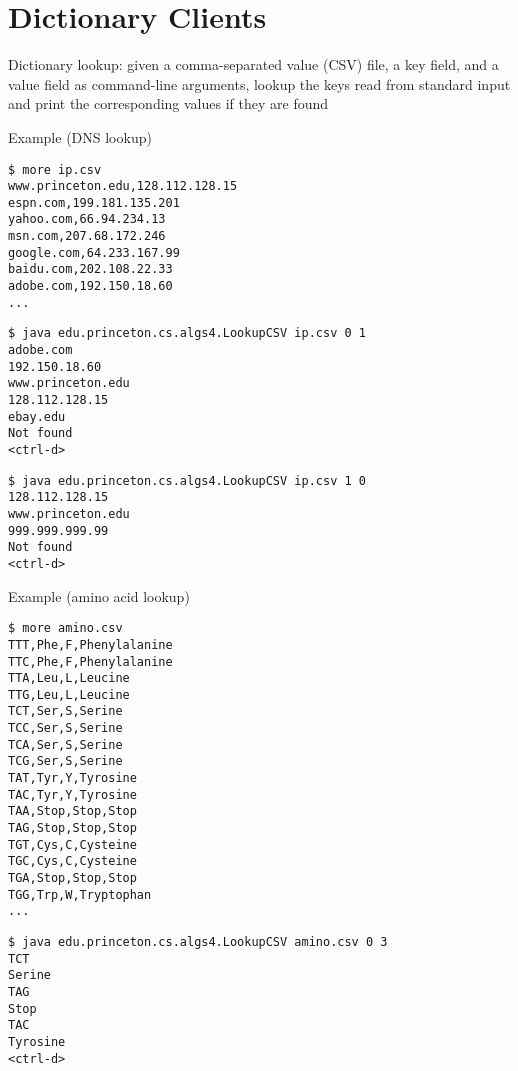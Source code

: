 \documentclass[8pt,a4paper,compress]{beamer}
\begin{document}
\section{Dictionary Clients}
\begin{frame}[fragile]
\pause

Dictionary lookup: given a comma-separated value (CSV) file, a key field, and a value field as command-line arguments, lookup the keys read from standard input and print the corresponding values if they are found

\pause
\bigskip

Example (DNS lookup)
\begin{lstlisting}[language={}]
$ more ip.csv
www.princeton.edu,128.112.128.15
espn.com,199.181.135.201
yahoo.com,66.94.234.13
msn.com,207.68.172.246
google.com,64.233.167.99
baidu.com,202.108.22.33
adobe.com,192.150.18.60
...
\end{lstlisting}
\begin{lstlisting}[language={}]
$ java edu.princeton.cs.algs4.LookupCSV ip.csv 0 1
adobe.com
192.150.18.60
www.princeton.edu
128.112.128.15
ebay.edu
Not found 
<ctrl-d>
\end{lstlisting}
\begin{lstlisting}[language={}]
$ java edu.princeton.cs.algs4.LookupCSV ip.csv 1 0
128.112.128.15
www.princeton.edu
999.999.999.99
Not found
<ctrl-d>
\end{lstlisting}
\end{frame}

\begin{frame}[fragile]
\pause

Example (amino acid lookup)
\begin{lstlisting}[language={}]
$ more amino.csv
TTT,Phe,F,Phenylalanine
TTC,Phe,F,Phenylalanine
TTA,Leu,L,Leucine
TTG,Leu,L,Leucine
TCT,Ser,S,Serine
TCC,Ser,S,Serine
TCA,Ser,S,Serine
TCG,Ser,S,Serine
TAT,Tyr,Y,Tyrosine
TAC,Tyr,Y,Tyrosine
TAA,Stop,Stop,Stop
TAG,Stop,Stop,Stop
TGT,Cys,C,Cysteine
TGC,Cys,C,Cysteine
TGA,Stop,Stop,Stop
TGG,Trp,W,Tryptophan
...
\end{lstlisting}

\begin{lstlisting}[language={}]
$ java edu.princeton.cs.algs4.LookupCSV amino.csv 0 3
TCT
Serine
TAG
Stop
TAC
Tyrosine
<ctrl-d>
\end{lstlisting}
\end{frame}
\end{document}
